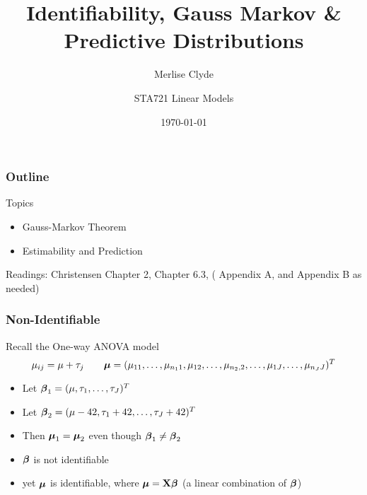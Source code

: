 \documentclass{beamer}\usepackage[]{graphicx}\usepackage[]{color}
\title{Identifiability, Gauss Markov \& Predictive Distributions}
\subtitle{Merlise Clyde}
\author{STA721 Linear Models}
\institute{Duke University}
\date{\today}
\begin{document}
\maketitle

\begin{frame}\frametitle{Outline}
Topics
  \begin{itemize}
  \item Gauss-Markov Theorem
  \item Estimability and Prediction
  \end{itemize}


Readings: Christensen Chapter 2,  Chapter 6.3, ( Appendix A, and
Appendix B as needed)
\end{frame}

\begin{frame}
\frametitle{Non-Identifiable }
  Recall the One-way ANOVA model
$$\mu_{ij} = \mu + \tau_j \qquad \boldsymbol{\mu} = (
    \mu_{11}, \ldots,\mu_{n_1 1},\mu_{12},\ldots, \mu_{n_2,2},\ldots, \mu_{1J},
\ldots,
\mu_{n_J J})^T $$
\begin{itemize}
\item Let $\boldsymbol{\beta}_{1} = (\mu, \tau_1, \ldots, \tau_J)^T$
\item Let $\boldsymbol{\beta}_{2} = (\mu - 42, \tau_1 + 42, \ldots, \tau_J + 42)^T$
\item Then $\boldsymbol{\mu}_{1} = \boldsymbol{\mu}_{2}$ even though  $\boldsymbol{\beta}_1 \neq \boldsymbol{\beta}_2$
\item $\boldsymbol{\beta}$ is not identifiable
\item yet  $\boldsymbol{\mu}$ is identifiable, where $\boldsymbol{\mu} = \mathbf{X} \boldsymbol{\beta}$  (a linear
  combination of $\boldsymbol{\beta}$)
\end{itemize}
\end{frame}
\end{document}
